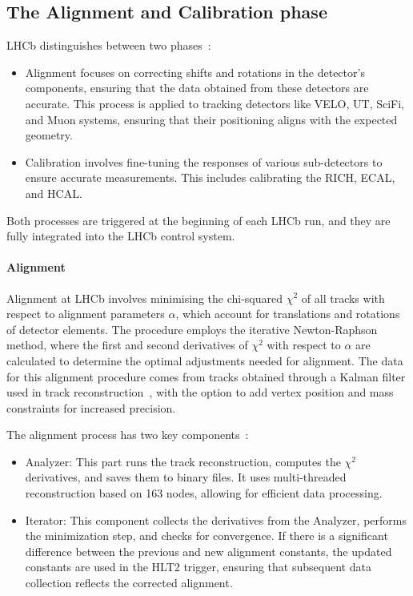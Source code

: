 \subsection{The Alignment and Calibration phase}\label{sec:alignment}
LHCb distinguishes between two phases~\cite{Dziurda:2640712}:
\begin{itemize}
\item Alignment focuses on correcting shifts and rotations in the detector's components, ensuring that the data obtained from these detectors are accurate. This process is applied to tracking detectors like VELO, UT, SciFi, and Muon systems, ensuring that their positioning aligns with the expected geometry.
\item Calibration involves fine-tuning the responses of various sub-detectors to ensure accurate measurements. This includes calibrating the RICH, ECAL, and HCAL.
\end{itemize}
Both processes are triggered at the beginning of each LHCb run, and they are fully integrated into the LHCb control system. 
\paragraph{Alignment}
Alignment at LHCb involves minimising the chi-squared $\chi^2$ of all tracks with respect to alignment parameters $\alpha$, which account for translations and rotations of detector elements. The procedure employs the iterative Newton-Raphson method\cite{raphson2011analysis}, where the first and second derivatives of $\chi^2$ with respect to $\alpha$ are calculated to determine the optimal adjustments needed for alignment. The data for this alignment procedure comes from tracks obtained through a Kalman filter used in track reconstruction~\cite{HULSBERGEN2009471}, with the option to add vertex position and mass constraints for increased precision.

The alignment process has two key components~\cite{Saur:20230E}:
\begin{itemize}
\item Analyzer: This part runs the track reconstruction, computes the $\chi^2$ derivatives, and saves them to binary files. It uses multi-threaded reconstruction based on 163 nodes, allowing for efficient data processing.
\item Iterator: This component collects the derivatives from the Analyzer, performs the minimization step, and checks for convergence. If there is a significant difference between the previous and new alignment constants, the updated constants are used in the HLT2 trigger, ensuring that subsequent data collection reflects the corrected alignment.
\end{itemize}


